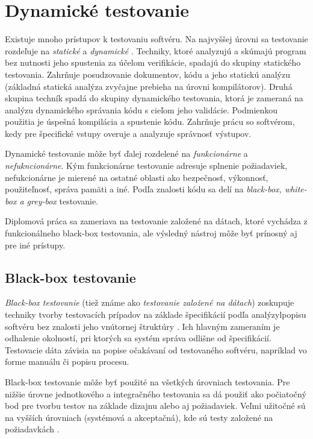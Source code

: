 \section{Dynamické testovanie}
\label{Dyn_t}
Existuje mnoho prístupov k testovaniu softvéru. Na najvyššej úrovni sa testovanie rozdeľuje na {\it statické} a {\it dynamické} \cite{Ist}. Techniky, ktoré analyzujú a skúmajú program bez nutnosti jeho spustenia za účelom verifikácie,  spadajú do skupiny statického testovania. Zahrňuje posudzovanie dokumentov, kódu a jeho statickú analýzu (základná statická analýza zvyčajne prebieha na úrovni kompilátorov). Druhá skupina techník spadá do skupiny dynamického testovania, ktorá je zameraná na analýzu dynamického správania kódu s cieľom jeho validácie. Podmienkou použitia je úspešná kompilácia a spustenie kódu. Zahrňuje prácu so softvérom, kedy pre špecifické vstupy overuje a analyzuje správnosť výstupov.

Dynamické testovanie môže byť ďalej rozdelené na {\it funkcionárne} a {\it nefukncionárne}. Kým funkcionárne testovanie adresuje splnenie požiadaviek, nefukcionárne je mierené na ostatné oblasti ako bezpečnosť, výkonnosť, použiteľnosť, správa pamäti a iné. Podľa znalosti kódu sa delí na {\it black-box, white-box a grey-box} testovanie.

Diplomová práca sa zameriava na testovanie založené na dátach, ktoré vychádza z funkcionálneho black-box testovania, ale výsledný nástroj môže byť prínosný aj pre iné prístupy.


\subsection*{Black-box testovanie}
{\it Black-box testovanie} (tiež známe ako {\it testovanie založené na dátach}) zoskupuje techniky tvorby testovacích prípadov na základe špecifikácií podľa analýzylpopisu softvéru bez znalosti jeho vnútornej štruktúry  \cite{Ast}. Ich hlavným zameraním je odhalenie okolností, pri ktorých sa systém správa odlišne od špecifikácií.  Testovacie dáta závisia na popise očakávaní od testovaného softvéru, napríklad vo forme manuálu či popisu procesu.

Black-box testovanie môže byť použité na všetkých úrovniach testovania. Pre nižšie úrovne jednotkového a integračného testovania sa dá použiť ako počiatočný bod pre tvorbu testov na základe dizajnu alebo aj požiadaviek. Veľmi užitočné sú na vyšších úrovniach (systémová a akceptačná), kde sú testy založené na požiadavkách  \cite{Gst}.


